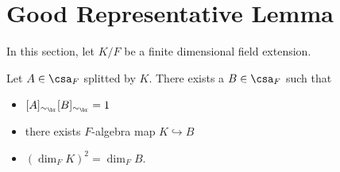 \section{Good Representative Lemma}
 In this section, let $K/F$ be a finite dimensional field extension.

 \begin{lemma}
   \label{lem:good-rep-inv}
   Let $A\in\csa_{F}$ splitted by $K$. There exists a $B\in\csa_{F}$ such that
   \begin{itemize}
     \item $[A]_{\sim_{\br}}[B]_{\sim_{\br}}=1$
     \item there exists $F$-algebra map $K\hookrightarrow B$
     \item ${\left(\dim_{F}K\right)}^{2}=\dim_{F}B$.
   \end{itemize}
   \leanok
 \end{lemma}
